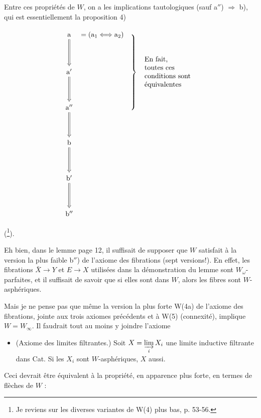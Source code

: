 \documentclass[11pt]{article}
\newcommand{\printedpage}[1]{\marginpar{\footnotesize p.~#1}}
\begin{document}
Entre ces propriétés de $W$, on a les implications tautologiques (sauf a$''$) $\Longrightarrow$ b), qui est essentiellement la proposition 4)

\printedpage{12}

\[
\begin{tikzcd}[row sep=huge, column sep=0pt]
\mathrm{a} \arrow[d, Rightarrow] & {}= (\mathrm{a}_1 \Longleftrightarrow \mathrm{a}_2) & \hspace{2.5cm} \\
\mathrm{a}' \arrow[d, Rightarrow] & & \smash{\left.\rule[-1.8cm]{0pt}{3.6cm}\right\}\ \text{\begin{tabular}{l}En fait,\\ toutes ces\\ conditions sont\\ équivalentes\end{tabular}}} \\
\mathrm{a}'' \arrow[d, Rightarrow] & & \\
\mathrm{b} \arrow[d, Rightarrow] & & \\
\mathrm{b}' \arrow[d, Rightarrow] & & \\
\mathrm{b}'' & &
\end{tikzcd}
\]

(\footnote[33]{Je reviens sur les diverses variantes de W(4) plus bas, p. 53-56.}).

Eh bien, dans le lemme page 12, il suffisait de supposer que $W$ satisfait à la version la plus faible b$''$) de l'axiome des fibrations (sept versions!). En effet, les fibrations $\bar{X} \longrightarrow Y$ et $E \longrightarrow X$ utilisées dans la démonstration du lemme sont $W_\omega$-parfaites, et il suffisait de savoir que si elles sont dans $W$, alors les fibres sont $W$-asphériques.

Mais je ne pense pas que même la version la plus forte W(4a) de l'axiome des fibrations, jointe aux trois axiomes précédents et à W(5) (connexité), implique $W = W_\infty$. Il faudrait tout au moins y joindre l'axiome

\begin{itemize}[leftmargin=4em, labelwidth=3em, labelsep=0.6em]
\item[\textbf{W(6)}] (Axiome des limites filtrantes.) Soit $X = \varinjlim\limits_{i} X_i$ une limite inductive filtrante dans Cat. Si les $X_i$ sont $W$-asphériques, $X$ aussi.
\end{itemize}

Ceci devrait être équivalent à la propriété, en apparence plus forte, en termes de flèches de $W$ :
\end{document}

